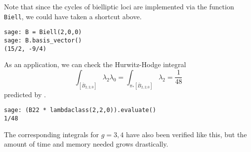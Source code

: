 \documentclass[11pt]{article}
\begin{document}
Note that since the cycles of bielliptic loci are implemented via the function \verb|Biell|, we could have taken a shortcut above.
\begin{lstlisting}
sage: B = Biell(2,0,0)
sage: B.basis_vector()
(15/2, -9/4)
\end{lstlisting}
% 
% 

As an application, we can check the Hurwitz-Hodge integral
\[\int_{[\overline B_{2,2,0}]} \lambda_2 \lambda_0 = \int_{\pi_* [\overline B_{2,2,0}]} \lambda_2 = \frac{1}{48} \]
predicted by \cite{hurwitzhodge}.
\begin{lstlisting}
sage: (B22 * lambdaclass(2,2,0)).evaluate()
1/48
\end{lstlisting}
The corresponding integrals for $g=3,4$ have also been verified like this, but the amount of time and memory needed grows drastically.
\end{document}
